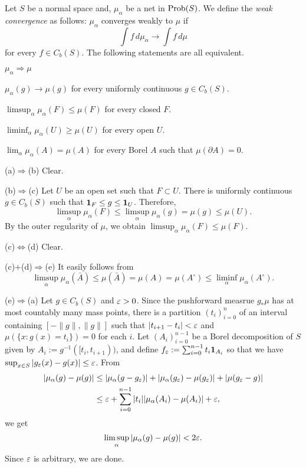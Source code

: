 \documentclass{../note}
\begin{document}




\begin{prb}
Let $S$ be a normal space and, $\mu_\alpha$ be a net in $\operatorname{Prob}(S)$.
We define the \emph{weak convergence} as follows: $\mu_\alpha$ converges weakly to $\mu$ if
\[\int f\,d\mu_\alpha\to\int f\,d\mu\]
for every $f\in C_b(S)$.
The following statements are all equivalent.
\begin{parts}
\item $\mu_\alpha\Rightarrow\mu$
\item $\mu_\alpha(g)\to\mu(g)$ for every uniformly continuous $g\in C_b(S)$.
\item $\limsup_\alpha\mu_\alpha(F)\le\mu(F)$ for every closed $F$.
\item $\liminf_\alpha\mu_\alpha(U)\ge\mu(U)$ for every open $U$.
\item $\lim_\alpha\mu_\alpha(A)=\mu(A)$ for every Borel $A$ such that $\mu(\partial A)=0$.
\end{parts}
\end{prb}
\begin{pf}
(a)$\Rightarrow$(b)
Clear.

(b)$\Rightarrow$(c)
Let $U$ be an open set such that $F\subset U$.
There is uniformly continuous $g\in C_b(S)$ such that $\mathbf{1}_F\le g\le\mathbf{1}_U$.
Therefore,
\[\limsup_\alpha\mu_\alpha(F)\le\limsup_\alpha\mu_\alpha(g)=\mu(g)\le\mu(U).\]
By the outer regularity of $\mu$, we obtain $\limsup_\alpha\mu_\alpha(F)\le\mu(F)$.

(c)$\Leftrightarrow$(d)
Clear.

(c)$+$(d)$\Rightarrow$(e)
It easily follows from
\[\limsup_\alpha\mu_\alpha(\bar A)\le\mu(\bar A)=\mu(A)=\mu(A^\circ)\le\liminf_\alpha\mu_\alpha(A^\circ).\]

(e)$\Rightarrow$(a)
Let $g\in C_b(S)$ and $\varepsilon>0$.
Since the pushforward measrue $g_*\mu$ has at most countably many mass points, there is a partition $(t_i)_{i=0}^n$ of an interval containing $[-\|g\|,\|g\|]$ such that $|t_{i+1}-t_i|<\varepsilon$ and $\mu(\{x:g(x)=t_i\})=0$ for each $i$.
Let $(A_i)_{i=0}^{n-1}$ be a Borel decomposition of $S$ given by $A_i:=g^{-1}([t_i,t_{i+1}))$, and define $f_\varepsilon:=\sum_{i=0}^{n-1}t_i\mathbf{1}_{A_i}$ so that we have $\sup_{x\in S}|g_\varepsilon(x)-g(x)|\le\varepsilon$.
From
\begin{align*}
|\mu_\alpha(g)-\mu(g)|&\le|\mu_\alpha(g-g_\varepsilon)|+|\mu_\alpha(g_\varepsilon)-\mu(g_\varepsilon)|+|\mu(g_\varepsilon-g)|\\
&\le\varepsilon+\sum_{i=0}^{n-1}|t_i||\mu_\alpha(A_i)-\mu(A_i)|+\varepsilon,
\end{align*}
we get
\[\limsup_\alpha|\mu_\alpha(g)-\mu(g)|<2\varepsilon.\]
Since $\varepsilon$ is arbitrary, we are done.
\end{pf}
\end{document}
